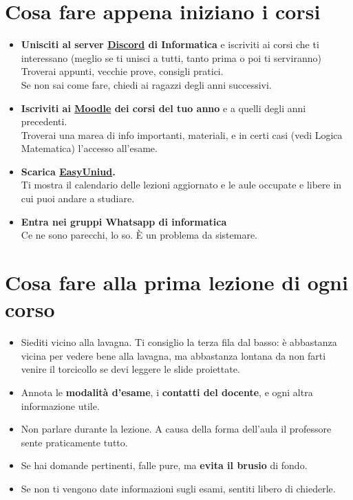 \documentclass{article}
\begin{document}
\section{Cosa fare appena iniziano i corsi}
\begin{itemize}
\item \textbf{Unisciti al server \href{https://discord.com/invite/pHHv6TE8WW}{Discord} di Informatica} e iscriviti ai corsi che ti interessano (meglio se ti unisci a tutti, tanto prima o poi ti serviranno)\\
  Troverai appunti, vecchie prove, consigli pratici.\\
  Se non sai come fare, chiedi ai ragazzi degli anni successivi.
\item \textbf{Iscriviti ai \href{https://elearning.uniud.it/moodle/login/index.php}{Moodle} dei corsi del tuo anno} e a quelli degli anni precedenti.\\
  Troverai una marea di info importanti, materiali, e in certi casi (vedi Logica Matematica) l'accesso all'esame.
\item \textbf{Scarica \href{https://play.google.com/store/apps/details?id=it.easystaff.uniud&hl=it}{EasyUniud}.}\\
  Ti mostra il calendario delle lezioni aggiornato e le aule occupate e libere in cui puoi andare a studiare.
\item \textbf{Entra nei gruppi Whatsapp di informatica}\\
Ce ne sono parecchi, lo so. È un problema da sistemare. 
\end{itemize}


\section{Cosa fare alla prima lezione di ogni corso}
\begin{itemize}
\item Siediti vicino alla lavagna. Ti consiglio la terza fila dal basso: è abbastanza vicina per vedere bene alla lavagna, ma abbastanza lontana da non farti venire il torcicollo se devi leggere le slide proiettate.
\item Annota le \textbf{modalità d'esame}, i \textbf{contatti del docente}, e ogni altra informazione utile.
\item Non parlare durante la lezione. A causa della forma dell'aula il professore sente praticamente tutto.
\item Se hai domande pertinenti, falle pure, ma \textbf{evita il brusio} di fondo.
\item Se non ti vengono date informazioni sugli esami, sentiti libero di chiederle.
\end{itemize}
\end{document}
